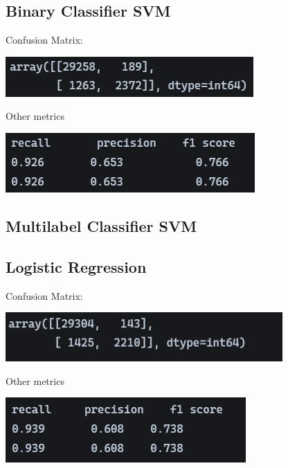 \documentclass[11pt]{article}
\begin{document}
\subsection{Binary Classifier SVM}
Confusion Matrix:
\begin{center}
	\includegraphics[scale=0.75]{figs/conf_bSVM.png}
\end{center}
Other metrics
\begin{center}
	\includegraphics[scale=0.75]{figs/rpf_bSVM.png}	
\end{center}


\subsection{Multilabel Classifier SVM}

\subsection{Logistic Regression}
Confusion Matrix:
\begin{center}
	\includegraphics[scale=0.75]{figs/conf_LR.png}
\end{center}
Other metrics
\begin{center}
	\includegraphics[scale=0.75]{figs/rpf_LR.png}	
\end{center}
\end{document}
